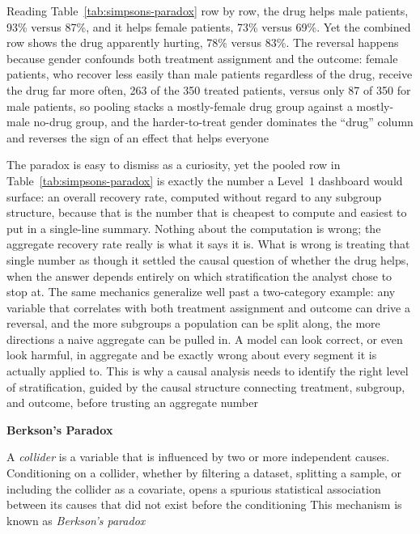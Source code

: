 Reading Table~\ref{tab:simpsons-paradox} row by row, the drug helps male
patients, 93\% versus 87\%, and it helps female patients, 73\% versus 69\%. Yet
the combined row shows the drug apparently hurting, 78\% versus 83\%. The
reversal happens because gender confounds both treatment assignment and the
outcome: female patients, who recover less easily than male patients regardless
of the drug, receive the drug far more often, 263 of the 350 treated patients,
versus only 87 of 350 for male patients, so pooling stacks a mostly-female
drug group against a mostly-male no-drug group, and the harder-to-treat gender
dominates the ``drug'' column and reverses the sign of an effect that helps
everyone

The paradox is easy to dismiss as a curiosity, yet the pooled row in Table~\ref{tab:simpsons-paradox}
is exactly the number a Level~1 dashboard would surface: an overall recovery
rate, computed without regard to any subgroup structure, because that is the
number that is cheapest to compute and easiest to put in a single-line summary. Nothing
about the computation is wrong; the aggregate recovery rate really is what it
says it is. What is wrong is treating that single number as though it settled the
causal question of whether the drug helps, when the answer depends entirely on
which stratification the analyst chose to stop at. The same mechanics generalize
well past a two-category example: any variable that correlates with both
treatment assignment and outcome can drive a reversal, and the more subgroups a population
can be split along, the more directions a naive aggregate can be pulled in. A model
can look correct, or even look harmful, in aggregate and be exactly wrong about every
segment it is actually applied to. This is why a causal analysis needs to
identify the right level of stratification, guided by the causal structure connecting
treatment, subgroup, and outcome, before trusting an aggregate number

\textbf{Berkson's Paradox}

\begin{definition}
  A \emph{collider} is a variable that is influenced by two or more independent
  causes. Conditioning on a collider, whether by filtering a dataset, splitting a
  sample, or including the collider as a covariate, opens a spurious statistical
  association between its causes that did not exist before the conditioning This
  mechanism is known as \emph{Berkson's paradox}
\end{definition}

